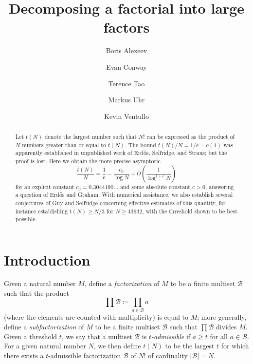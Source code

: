 \documentclass[12pt,a4paper,reqno]{amsart}
\numberwithin{equation}{section}
\theoremstyle{plain}
\theoremstyle{definition}
\newcommand\tuple{{\mathcal B}}
\begin{document}
\title{Decomposing a factorial into large factors}

\author{Boris Alexeev}
\address{???}


\author{Evan Conway}
\address{???}

\author{Terence Tao}
\address{UCLA Department of Mathematics, Los Angeles, CA 90095-1555.}

\author{Markus Uhr}
\address{???}

\author{Kevin Ventullo}
\address{Google, Mountain View, CA}



\begin{abstract}  Let $t(N)$ denote the largest number such that $N!$ can be expressed as the product of $N$ numbers greater than or equal to $t(N)$.
The bound $t(N)/N = 1/e-o(1)$ was apparently established in unpublished work of Erd\H{o}s, Selfridge, and Straus; but the proof is lost.  Here we obtain the more precise asymptotic 
$$ \frac{t(N)}{N} = \frac{1}{e} - \frac{c_0}{\log N} + O\left( \frac{1}{\log^{1+c} N} \right)$$
for an explicit constant $c_0 = 0.3044190\dots$ and some absolute constant $c>0$, answering a question of Erd\H{o}s and Graham.  With numerical assistance, we also establish several conjectures of Guy and Selfridge concerning effective estimates of this quantity, for instance establishing $t(N) \geq N/3$ for $N \geq 43632$, with the threshold shown to be best possible. 
\end{abstract}


\maketitle


\section{Introduction}

Given a natural number $M$, define a \emph{factorization} of $M$ to be a finite multiset $\tuple$ such that the product
$$ \prod \tuple \coloneqq \prod_{a \in \tuple} a$$
(where the elements are counted with multiplicity) is equal to $M$; more generally, define a \emph{subfactorization} of $M$ to be a finite multiset $\tuple$ such that $\prod \tuple$ divides $M$.  Given a threshold $t$, we say that a multiset $\tuple$ is \emph{$t$-admissible} if $a \geq t$ for all $a \in \tuple$.  For a given natural number $N$, we then define $t(N)$ to be the largest $t$ for which there exists a $t$-admissible factorization $\tuple$ of $N!$ of cardinality $|\tuple|=N$.  
\end{document}

